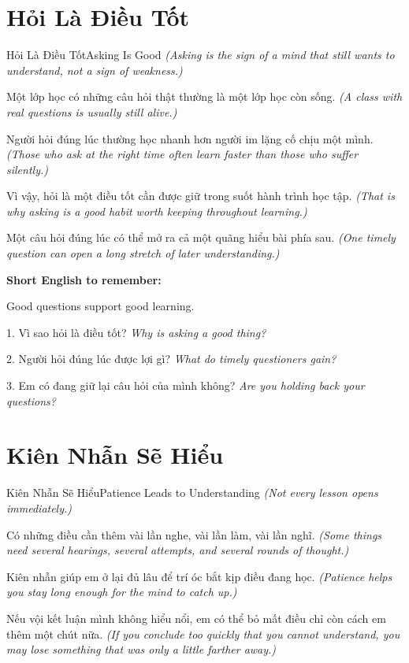 \section{Hỏi Là Điều Tốt}
\begin{truyen}{Hỏi Là Điều Tốt}{Asking Is Good}
\textit{(Asking is the sign of a mind that still wants to understand, not a sign of weakness.)}

Một lớp học có những câu hỏi thật thường là một lớp học còn sống.
\textit{(A class with real questions is usually still alive.)}

Người hỏi đúng lúc thường học nhanh hơn người im lặng cố chịu một mình.
\textit{(Those who ask at the right time often learn faster than those who suffer silently.)}

Vì vậy, hỏi là một điều tốt cần được giữ trong suốt hành trình học tập.
\textit{(That is why asking is a good habit worth keeping throughout learning.)}
\end{truyen}

\begin{baihoc}
Một câu hỏi đúng lúc có thể mở ra cả một quãng hiểu bài phía sau.
\textit{(One timely question can open a long stretch of later understanding.)}
\end{baihoc}

\begin{ghinhoanh}
\textbf{Short English to remember:}

Good questions support good learning.

\end{ghinhoanh}

\begin{tuhocnhanh}
1. Vì sao hỏi là điều tốt? \textit{Why is asking a good thing?}

2. Người hỏi đúng lúc được lợi gì? \textit{What do timely questioners gain?}

3. Em có đang giữ lại câu hỏi của mình không? \textit{Are you holding back your questions?}
\end{tuhocnhanh}
\ngancach

\section{Kiên Nhẫn Sẽ Hiểu}
\begin{truyen}{Kiên Nhẫn Sẽ Hiểu}{Patience Leads to Understanding}
\textit{(Not every lesson opens immediately.)}

Có những điều cần thêm vài lần nghe, vài lần làm, vài lần nghĩ.
\textit{(Some things need several hearings, several attempts, and several rounds of thought.)}

Kiên nhẫn giúp em ở lại đủ lâu để trí óc bắt kịp điều đang học.
\textit{(Patience helps you stay long enough for the mind to catch up.)}

Nếu vội kết luận mình không hiểu nổi, em có thể bỏ mất điều chỉ còn cách em thêm một chút nữa.
\textit{(If you conclude too quickly that you cannot understand, you may lose something that was only a little farther away.)}
\end{truyen}

